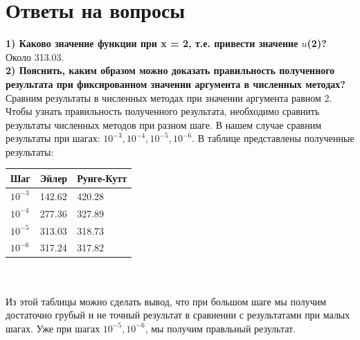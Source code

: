 \documentclass[a4paper, 12pt]{article}
\begin{document}
\section{Ответы на вопросы}
\textbf{1) Каково значение функции при x = 2, т.е. привести значение $u$(2)?}
\\Около 313.03.
\\ \textbf{2) Пояснить,  каким  образом  можно  доказать  правильность полученного  результата  при фиксированном значении аргумента в численных методах?}
\\ Сравним результаты в численных методах при значении аргумента равном 2. Чтобы узнать правильность полученного результата, необходимо сравнить результаты численных методов при разном шаге. В нашем случае сравним результаты при шагах: $10^{-3}, 10^{-4}, 10^{-5}, 10^{-6}$. В таблице представлены полученные результаты:

\vspace*{10mm}\hspace*{40mm}\begin{tabular}{ | l | l | l | }
	\hline
	\textbf{Шаг}& \textbf{Эйлер} & \textbf{Рунге-Кутт} \\ \hline
	$10^{-3}$ & 142.62 & 420.28\\ \hline
	$10^{-4}$ & 277.36 & 327.89\\ \hline
	$10^{-5}$ & 313.03 & 318.73\\ \hline
	$10^{-6}$ & 317.24 & 317.82\\ \hline
\end{tabular}
\\ \\ Из этой таблицы можно сделать вывод, что при большом шаге мы получим достаточно грубый и не точный результат в сравнении с результатами при малых шагах. Уже при шагах $10^{-5}, 10^{-6}$, мы получим правльный результат.
\end{document}
